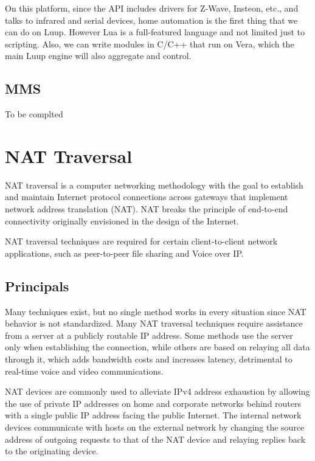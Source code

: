 On this platform, since the API includes drivers for Z-Wave, Insteon, etc., and talks to infrared and serial devices, home automation is the first thing that we can do on Luup. However Lua is a full-featured language and not limited just to scripting. Also, we can write modules in C/C++ that run on Vera, which the main Luup engine will also aggregate and control.

\subsection{MMS}
To be complted
\section{NAT Traversal}
NAT traversal is a computer networking methodology with the goal to establish and maintain Internet protocol connections across gateways that implement network address translation (NAT). NAT breaks the principle of end-to-end connectivity originally envisioned in the design of the Internet.

NAT traversal techniques are required for certain client-to-client network applications, such as peer-to-peer file sharing and Voice over IP.\cite{stiemerling2008nat}


\subsection{Principals}

Many techniques exist, but no single method works in every situation since NAT behavior is not standardized. Many NAT traversal techniques require assistance from a server at a publicly routable IP address\cite{rosenberg2003stun}. Some methods use the server only when establishing the connection, while others are based on relaying all data through it, which adds bandwidth costs and increases latency, detrimental to real-time voice and video communications.

NAT devices are commonly used to alleviate IPv4 address exhaustion\cite{alqahtaniipv4} by allowing the use of private IP addresses on home and corporate networks behind routers with a single public IP address facing the public Internet. The internal network devices communicate with hosts on the external network by changing the source address of outgoing requests to that of the NAT device and relaying replies back to the originating device.

